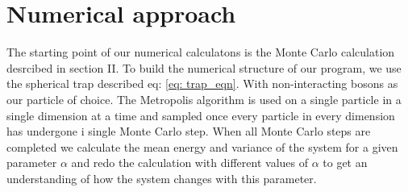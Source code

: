\documentclass[a4paper, 10pt, english]{revtex4-2} %
\begin{document}
\section{\large Numerical approach}
    The starting point of our numerical calculatons is the Monte Carlo calculation desrcibed in section II.
    To build the numerical structure of our program, we use the spherical trap described eq: \ref{eq: trap_eqn}.
    With non-interacting bosons as our particle of choice.
    The Metropolis algorithm is used on a single particle in a single dimension at a time and sampled once every particle in every dimension has undergone i single Monte Carlo step.
    When all Monte Carlo steps are completed we calculate the mean energy and variance of the system for a given parameter $\alpha$ and redo the calculation with different values of $\alpha$ to get an understanding of how the system changes with this parameter.
    
\end{document}
